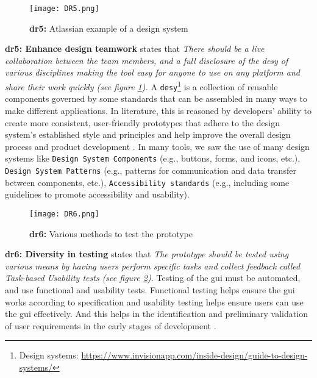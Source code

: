 \begin{figure}[htbp!]
  \centering    
  \texttt{[image: DR5.png]}
  \caption[Design System]{\textbf{\ac{dr}5:} Atlassian example of a design system}
  \label{fig:design:dr5}
\end{figure}
\textbf{\ac{dr}5: Enhance design teamwork} states that \textit{There should be a live collaboration between the team members, and a full disclosure of the \ac{desy} of various disciplines making the tool easy for anyone to use on any platform and share their work quickly (see figure \ref{fig:design:dr5}).} 
A \texttt{\ac{desy}}\footnote{Design systems: \url{https://www.invisionapp.com/inside-design/guide-to-design-systems/}} is a collection of reusable components governed by some standards that can be assembled in many ways to make different applications.
In literature, this is reasoned by developers' ability to create more consistent, user-friendly prototypes that adhere to the design system's established style and principles \cite{paper:prototyping:luqi} and help improve the overall design process and product development \cite{article:prototyping:hoffnagle}.
In many tools, we saw the use of many design systems like \texttt{Design System Components} (e.g., buttons, forms, and icons, etc.), \texttt{Design System Patterns} (e.g., patterns for communication and data transfer between components, etc.), \texttt{Accessibility standards} (e.g., including some guidelines to promote accessibility and usability).

\begin{figure}[htbp!]
  \centering    
  \texttt{[image: DR6.png]}
  \caption[Testing the prototype]{\textbf{\ac{dr}6:} Various methods to test the prototype}
  \label{fig:design:dr6}
\end{figure}
\textbf{\ac{dr}6: Diversity in testing} states that \textit{The prototype should be tested using various means by having users perform specific tasks and collect feedback called Task-based Usability tests (see figure \ref{fig:design:dr6}).} 
Testing of the \ac{gui} must be automated, and use functional and usability tests. 
Functional testing helps ensure the \ac{gui} works according to specification and usability testing helps ensure users can use the \ac{gui} effectively. 
And this helps in the identification and preliminary validation of user requirements in the early stages of development \cite{article:prototyping:weichbroth}.

